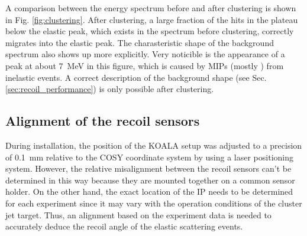 \documentclass[number,5p]{elsarticle}
\begin{document}
A comparison between the energy spectrum before and after clustering is shown in Fig. \ref{fig:clustering}.
After clustering, a large fraction of the hits in the plateau below the elastic peak, which exists in the spectrum before clustering, correctly migrates into the elastic peak.
The charasteristic shape of the background spectrum also shows up more explicitly.
Very noticible is the appearance of a peak at about \SI{7}{\MeV} in this figure,
which is caused by MIPs (mostly \Pgppm) from inelastic events.
A correct description of the background shape (see Sec.
\ref{sec:recoil_performance}) is only possible after clustering.

\subsection{Alignment of the recoil sensors}
\label{sec:alignment}

During installation, the position of the KOALA setup was adjusted to a precision
of \SI{0.1}{\mm} relative to the COSY coordinate system by using a laser positioning system.
However, the relative misalignment between the recoil sensors can't be
determined in this way because they are mounted together on a common sensor holder.
On the other hand, the exact location of the IP needs to be determined for each experiment since
it may vary with the operation conditions of the cluster jet target.
Thus, an alignment based on the experiment data is needed to accurately deduce the recoil angle of the elastic scattering events.
\end{document}
